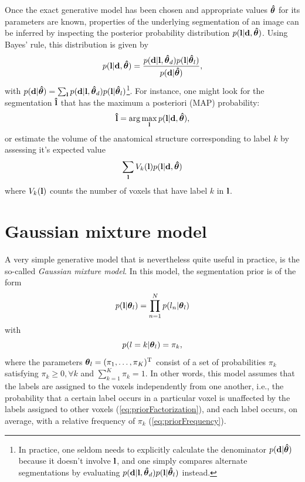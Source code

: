 \documentclass[10pt,twoside]{book}
\begin{document}
Once the exact generative model has been chosen and appropriate values 
${\mbox{\boldmath {${\hat{\theta}}$}}}$
for its parameters are known, properties of the underlying segmentation of an image can be inferred by inspecting the posterior probability distribution $p( \mathbf{l} | \mathbf{d}, {\mbox{\boldmath {${\hat{\theta}}$}}})$. Using Bayes' rule, this distribution is given by
\begin{equation}
  p( \mathbf{l} | \mathbf{d}, {\mbox{\boldmath {${\hat{\theta}}$}}}) = \frac{ p( \mathbf{d} | \mathbf{l}, {\mbox{\boldmath {${\hat{\theta}}$}}}_d ) p( \mathbf{l} | {\mbox{\boldmath {${\hat{\theta}}$}}}_l ) }{ p( \mathbf{d} | {\mbox{\boldmath {${\hat{\theta}}$}}}) },
  \label{eq:posterior}
\end{equation}
with $p( \mathbf{d} | {\mbox{\boldmath {${\hat{\theta}}$}}}) = \sum_{\mathbf{l}} p( \mathbf{d} | \mathbf{l}, {\mbox{\boldmath {${\hat{\theta}}$}}}_d ) p( \mathbf{l} | {\mbox{\boldmath {${\hat{\theta}}$}}}_l )$\footnote{In practice, one seldom needs to explicitly calculate the denominator $p( \mathbf{d} | {\mbox{\boldmath {${\hat{\theta}}$}}})$ because it doesn't involve $\mathbf{l}$, and one simply compares alternate segmentations by evaluating $p( \mathbf{d} | \mathbf{l}, {\mbox{\boldmath {${\hat{\theta}}$}}}_d ) p( \mathbf{l} | {\mbox{\boldmath {${\hat{\theta}}$}}}_l )$ instead.}.
For instance, one might look for the segmentation $\mathbf{\hat{l}}$ that has the maximum a posteriori (MAP) probability:
\begin{equation}
  \mathbf{\hat{l}} = \arg\max_{\mathbf{l}} p( \mathbf{l} | \mathbf{d}, {\mbox{\boldmath {${\hat{\theta}}$}}}),
  \label{eq:MAP}
\end{equation}
or estimate the volume of the anatomical structure corresponding to label $k$ by assessing it's expected value
\begin{equation}
 \sum_{\mathbf{l}} V_k( \mathbf{l} )  p( \mathbf{l} | \mathbf{d}, {\mbox{\boldmath {${\hat{\theta}}$}}} )
  \label{eq:volume}
\end{equation}
where $V_k( \mathbf{l} )$ counts the number of voxels that have label $k$ in $\mathbf{l}$.



\section{Gaussian mixture model}
\label{sec:GMM}

A very simple generative model that is nevertheless quite useful in practice, is the so-called \emph{Gaussian mixture model}. In this model, the segmentation prior is of the form
\begin{equation}
  p( \mathbf{l} | {\mbox{\boldmath {${\theta}$}}}_l ) 
  =  
  \prod_{n=1}^N p( l_n | {\mbox{\boldmath {${\theta}$}}}_l )
  \label{eq:priorFactorization}
\end{equation}
with
\begin{equation}
  p( l=k | {\mbox{\boldmath {${\theta}$}}}_l ) = \pi_k
  ,
  \label{eq:priorFrequency}
\end{equation}
where the parameters ${\mbox{\boldmath {${\theta}$}}}_l = ( \pi_1, \ldots, \pi_K )^\mathrm{T}$ consist of a set of probabilities $\pi_k$ satisfying $\pi_k \geq 0, \forall k$ and $\sum_{k=1}^K \pi_k = 1$. In other words, this model assumes that the labels are assigned to the voxels independently from one another, i.e., the probability that a certain label occurs in a particular voxel is unaffected by the labels assigned to other voxels (\eqref{eq:priorFactorization}), and each label occurs, on average, with a relative frequency of $\pi_k$ (\eqref{eq:priorFrequency}).
\end{document}
